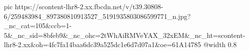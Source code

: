  
 
 
 
 

\ifcmt
  pic https://scontent-lhr8-2.xx.fbcdn.net/v/t39.30808-6/259483984_897380810913527_5191935803086599771_n.jpg?_nc_cat=105&ccb=1-5&_nc_sid=8bfeb9&_nc_ohc=2tWhAiRMVeYAX_32xEM&_nc_ht=scontent-lhr8-2.xx&oh=4fc7fa14baa6dc39a525dc1e6d7d07a1&oe=61A14785
  @width 0.8
\fi
